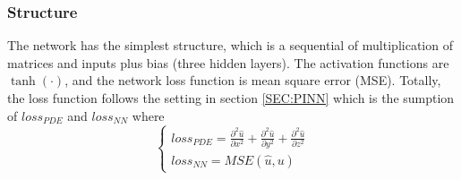 \subsubsection{Structure}
The network has the simplest structure, which is a sequential of multiplication of matrices and inputs plus bias (three hidden layers).
The activation functions are $\tanh(\cdot)$, and the network loss function is mean square error (MSE).
Totally, the loss function follows the setting in section \ref{SEC:PINN} which is the sumption of $loss_{PDE}$ and $loss_{NN}$ where 
\begin{equation}
  \begin{cases}
    \displaystyle loss_{PDE} = \frac{\partial^2 \widehat{u}}{\partial x^2} + \frac{\partial^2 \widehat{u}}{\partial y^2} + \frac{\partial^2 \widehat{u}}{\partial z^2}  \\
    \displaystyle loss_{NN} = MSE(\widehat{u}, u)    
  \end{cases}
\end{equation}














